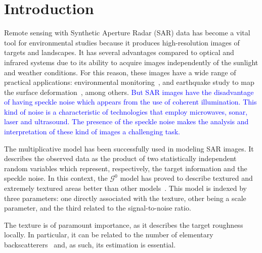 \documentclass[twocolumn]{svjour3}
\begin{document}
\section{Introduction}
\label{intro}

Remote sensing with Synthetic Aperture Radar (SAR) data has become a vital tool for environmental studies because it produces high-resolution images of targets and landscapes. 
It  has  several  advantages  compared  to  optical  and  infrared systems due to its ability to acquire images independently of the sunlight and weather conditions. 
For this reason, these images have a wide range of practical applications: environmental monitoring~\cite{White1991,Brisco2013}, and
earthquake study to map the surface deformation~\cite{Yinghui2017}, among others.  
\textcolor{blue}{But SAR images have the disadvantage of having speckle noise which appears from the use of coherent illumination. This kind of noise is a characteristic of technologies that
	employ microwaves, sonar, laser and ultrasound. The presence of the speckle noise makes the analysis and interpretation of these kind of images a challenging task.}

The multiplicative model has been successfully used in modeling SAR images.
It describes the observed data as the product of two statistically independent random variables which represent, respectively, the target information and the speckle noise. 
In this context, the $\mathcal{G}^0$ model has proved to describe textured and extremely textured areas better than other models~\cite{Frery97,MejailJacoboFreryBustos:IJRS}. 
This model is indexed by three parameters: 
one directly associated with the texture, 
other being a scale parameter, 
and the third related to the signal-to-noise ratio.

The texture is of paramount importance, as it describes the target roughness locally.
In particular, it can be related to the number of elementary backscatterers~\cite{AGeneralizedGaussianCoherentScattererModelforCorrelatedSARTexture} and, as such, its estimation is essential.
\end{document}
